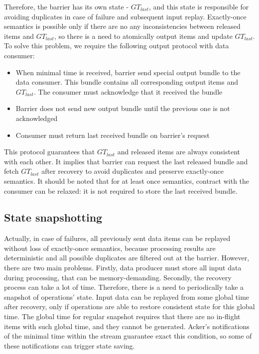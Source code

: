 Therefore, the barrier has its own state - $GT_{last}$, and this state is responsible for avoiding duplicates in case of failure and subsequent input replay. Exactly-once semantics is possible only if there are no any inconsistencies between released items and $GT_{last}$, so there is a need to atomically output items and update $GT_{last}$. To solve this problem, we require the following output protocol with data consumer:

\begin{itemize}
    \item When minimal time is received, barrier send special output bundle to the data consumer. This bundle contains all corresponding output items and $GT_{last}$. The consumer must acknowledge that it received the bundle
    \item Barrier does not send new output bundle until the previous one is not acknowledged
    \item Consumer must return last received bundle on barrier's request 
\end{itemize}

This protocol guarantees that $GT_{last}$ and released items are always consistent with each other. It implies that barrier can request the last released bundle and fetch $GT_{last}$ after recovery to avoid duplicates and preserve exactly-once semantics. It should be noted that for at least once semantics, contract with the consumer can be relaxed: it is not required to store the last received bundle.

\subsection{State snapshotting}
Actually, in case of failures, all previously sent data items can be replayed without loss of exactly-once semantics, because processing results are deterministic and all possible duplicates are filtered out at the barrier. However, there are two main problems. Firstly, data producer must store all input data during processing, that can be memory-demanding. Secondly, the recovery process can take a lot of time. Therefore, there is a need to periodically take a snapshot of operations' state. Input data can be replayed from some global time after recovery, only if operations are able to restore consistent state for this global time. The global time for regular snapshot requires that there are no in-flight items with such global time, and they cannot be generated. Acker's notifications of the minimal time within the stream guarantee exact this condition, so some of these notifications can trigger state saving. 

